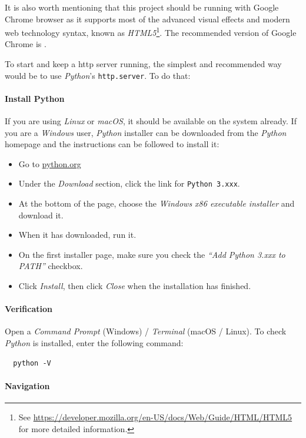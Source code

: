 It is also worth mentioning that this project should be running with Google Chrome browser as it supports most of the advanced visual effects and modern web technology syntax, known as \emph{HTML5}\footnote{ See \url{https://developer.mozilla.org/en-US/docs/Web/Guide/HTML/HTML5} for more detailed information.}. The recommended version of Google Chrome is .

To start and keep a \gls{http} server running, the simplest and recommended way would be to use \emph{Python}'s \texttt{http.server}. To do that\cite{bib:moz:simplehttp}:

\paragraph{Install Python} If you are using \emph{Linux} or \emph{macOS}, it should be available on the system already. If you are a \emph{Windows} user, \emph{Python} installer can be downloaded from the \emph{Python} homepage and the instructions can be followed to install it:

\begin{itemize}
  \item Go to \url{python.org}
  \item Under the \emph{Download} section, click the link for \texttt{Python 3.xxx}.
  \item At the bottom of the page, choose the \emph{Windows x86 executable installer} and download it.
  \item When it has downloaded, run it.
  \item On the first installer page, make sure you check the \emph{``Add Python 3.xxx to PATH''} checkbox.
  \item Click \emph{Install}, then click \emph{Close} when the installation has finished.
\end{itemize}

\paragraph{Verification}

Open a \emph{Command Prompt} (Windows) / \emph{Terminal} (macOS / Linux). To check \emph{Python} is installed, enter the following command:

\begin{verbatim}
  python -V
\end{verbatim}

\paragraph{Navigation}


